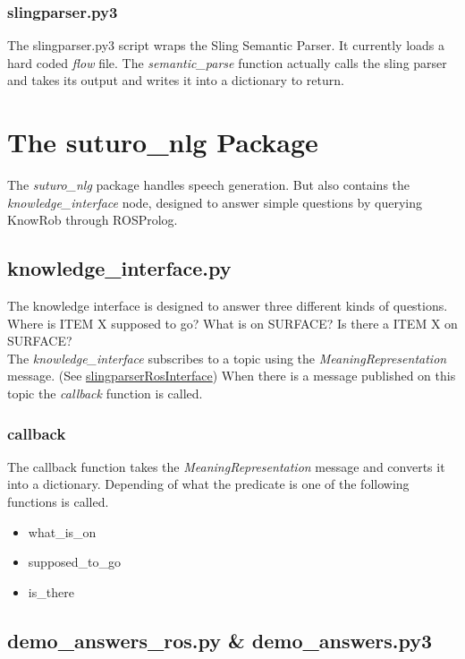 \documentclass[main.tex]{subfiles}
\begin{document}
        \subsubsection{slingparser.py3}
            The slingparser.py3 script wraps the Sling Semantic Parser. It currently loads a hard coded \textit{flow} file.
            The \textit{semantic\_parse} function actually calls the sling parser and takes its output and writes it into a dictionary to return.
    
\section{The suturo\_nlg Package}
    The \textit{suturo\_nlg} package handles speech generation. But also contains the \textit{knowledge\_interface} node, designed to answer simple questions by querying KnowRob through ROSProlog.
    \subsection{knowledge\_interface.py}
        The knowledge interface is designed to answer three different kinds of questions. Where is ITEM X supposed to go? What is on SURFACE? Is there a ITEM X on SURFACE?\\
        The \textit{knowledge\_interface} subscribes to a topic using the \textit{MeaningRepresentation} message. (See \hyperref[slingparserros]{slingparserRosInterface}) When there is a message published on this topic the \textit{callback} function is called.
        \subsubsection{callback}
            The callback function takes the \textit{MeaningRepresentation} message and converts it into a dictionary.
            Depending of what the predicate is one of the following functions is called.
            \begin{itemize}
                \item what\_is\_on
                \item supposed\_to\_go
                \item is\_there             
            \end{itemize}
    \subsection{demo\_answers\_ros.py \& demo\_answers.py3}
    
\end{document}
